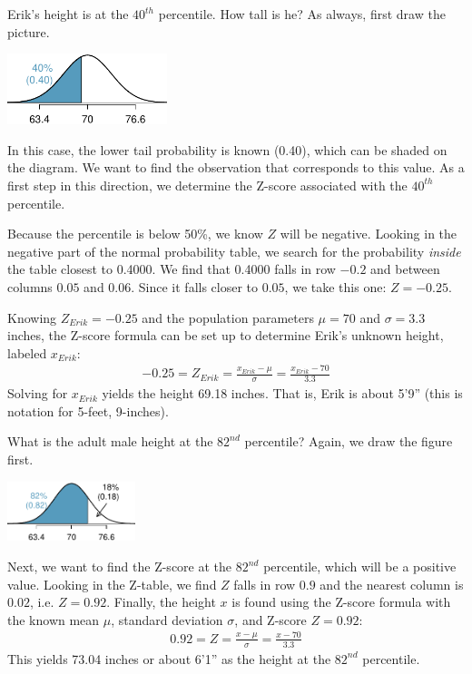 \begin{example}{Erik's height is at the $40^{th}$ percentile. How tall is he?}\label{normalExam40Perc}
As always, first draw the picture.\vspace{-1mm}
\begin{center}
\includegraphics[width=0.35\textwidth]{ch_distributions/figures/height40Perc/height40Perc}\vspace{-1mm}
\end{center}
In this case, the lower tail probability is known (0.40), which can be shaded on the diagram. We want to find the observation that corresponds to this value. As a first step in this direction, we determine the Z-score associated with the $40^{th}$ percentile.

Because the percentile is below 50\%, we know $Z$ will be negative. Looking in the negative part of the normal probability table, we search for the probability \emph{inside} the table closest to 0.4000. We find that 0.4000 falls in row $-0.2$ and between columns $0.05$ and $0.06$. Since it falls closer to $0.05$, we take this one: $Z=-0.25$.

Knowing $Z_{Erik}=-0.25$ and the population parameters $\mu=70$ and $\sigma=3.3$ inches, the Z-score formula can be set up to determine Erik's unknown height, labeled $x_{Erik}$:
\begin{eqnarray*}
-0.25 = Z_{Erik} = \frac{x_{Erik} - \mu}{\sigma} = \frac{x_{Erik} - 70}{3.3}
\end{eqnarray*}
Solving for $x_{Erik}$ yields the height 69.18 inches. That is, Erik is about 5'9'' (this is notation for 5-feet, 9-inches).
\end{example}

\begin{example}{What is the adult male height at the $82^{nd}$ percentile?}
Again, we draw the figure first.\textC{\vspace{-3mm}}
\begin{center}
\includegraphics[width=0.28\textwidth]{ch_distributions/figures/height82Perc/height82Perc}\textC{\vspace{-1mm}}
\end{center}
Next, we want to find the Z-score at the $82^{nd}$ percentile, which will be a positive value. Looking in the Z-table, we find $Z$ falls in row $0.9$ and the nearest column is $0.02$, i.e. $Z=0.92$. Finally, the height $x$ is found using the Z-score formula with the known mean $\mu$, standard deviation $\sigma$, and Z-score $Z=0.92$:
\begin{eqnarray*}
0.92 = Z = \frac{x-\mu}{\sigma} = \frac{x - 70}{3.3}
\end{eqnarray*}
This yields 73.04 inches or about 6'1'' as the height at the $82^{nd}$ percentile.
\end{example}

